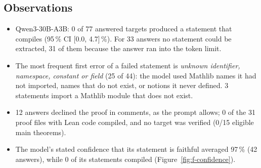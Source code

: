 \documentclass[11pt]{article}
\begin{document}
\clearpage
\subsection*{Observations}
\begin{itemize}\setlength\itemsep{2pt}
\item Qwen3-30B-A3B: 0 of 77 answered targets produced a statement that compiles (95\,\% CI [0.0, 4.7]\,\%). For 33 answers no statement could be extracted, 31 of them because the answer ran into the token limit.
\item The most frequent first error of a failed statement is \emph{unknown identifier, namespace, constant or field} (25 of 44): the model used Mathlib names it had not imported, names that do not exist, or notions it never defined. 3 statements import a Mathlib module that does not exist.
\item 12 answers declined the proof in comments, as the prompt allows; 0 of the 31 proof files with Lean code compiled, and no target was verified (0/15 eligible main theorems).
\item The model's stated confidence that its statement is faithful averaged 97\,\% (42 answers), while 0 of its statements compiled (Figure~\ref{fig:f-confidence}).
\end{itemize}

\end{document}
